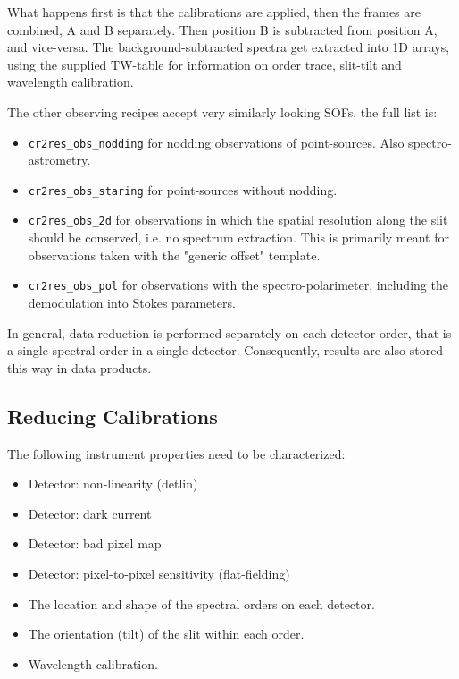 What happens first is that the calibrations are applied, then the frames are
combined, A and B separately. Then position B is subtracted from position A, and
vice-versa. The background-subtracted spectra get extracted into 1D arrays,
using the supplied TW-table for information on order trace, slit-tilt and
wavelength calibration.

The other observing recipes accept very similarly looking SOFs, the full list
is:
\begin{itemize}
    \item \texttt{cr2res\_obs\_nodding} for nodding observations of
        point-sources. Also spectro-astrometry.
    \item \texttt{cr2res\_obs\_staring} for point-sources without nodding.
    \item \texttt{cr2res\_obs\_2d} for observations in which the spatial
        resolution along the slit should be conserved, i.e. no spectrum
        extraction. This is primarily meant for observations taken with the
        "generic offset" template.
    \item \texttt{cr2res\_obs\_pol} for observations with the
        spectro-polarimeter, including the demodulation into Stokes parameters. 
\end{itemize}


In general, data reduction is performed separately on each detector-order,
that is a single spectral order in a single detector.
Consequently, results are also stored this way in data products.


\subsection{Reducing Calibrations}
\label{sec:calib:reduc}

The following instrument properties need to be characterized:
\begin{itemize}
    \item Detector: non-linearity (detlin)
    \item Detector: dark current
    \item Detector: bad pixel map
    \item Detector: pixel-to-pixel sensitivity (flat-fielding)
    \item The location and shape of the spectral orders on each detector.
    \item The orientation (tilt) of the slit within each order.
    \item Wavelength calibration.
\end{itemize}

